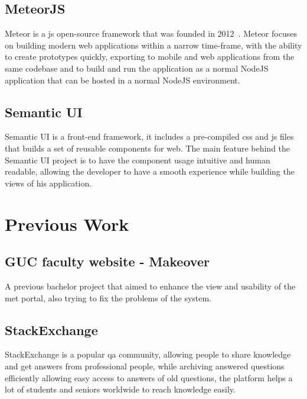 \subsection{MeteorJS}
\label{sub:meteor}
Meteor is a \ac{js} open-source framework that was founded in 2012~\cite{meteor_launch}.
Meteor focuses on building modern web applications within a narrow time-frame, with the ability to create prototypes quickly, exporting to mobile
and web applications from the same codebase and to build and run the application as a normal NodeJS application that can be hosted in a normal
NodeJS environment.

\subsection{Semantic UI}
\label{sub:semantic_ui}
Semantic UI is a front-end framework, it includes a pre-compiled \ac{css} and \ac{js} files that builds a set of reusable components
for web. The main feature behind the Semantic UI project is to have the component usage intuitive and human readable, allowing
the developer to have a smooth experience while building the views of his application.~\cite{semantic_ui}

\section{Previous Work}
\label{sec:previous-work}

\subsection{GUC faculty website - Makeover}
\label{sub:met-makeover-project}
A previous bachelor project that aimed to enhance the view and usability of the \ac{met} portal, also trying to fix the
problems of the system.~\cite{met-makeover}

\subsection{StackExchange}
\label{sub:stackexchange}
StackExchange is a popular \ac{qa} community, allowing people to share knowledge and get answers from professional
people, while archiving answered questions efficiently allowing easy access to answers of old questions, the
platform helps a lot of students and seniors worldwide to reach knowledge easily.
